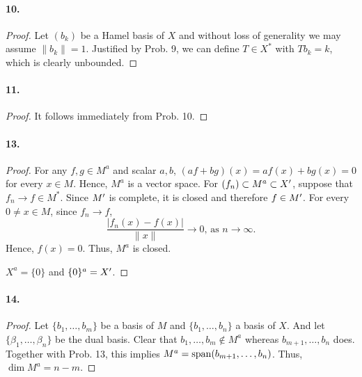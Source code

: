   \paragraph{10.}
  \begin{proof}
    Let $(b_k)$ be a Hamel basis of $X$ and without loss of generality we may
    assume $\|b_k\|=1$. Justified by Prob. 9, we can define $T\in X^*$ with 
    $Tb_k=k$, which is clearly unbounded.
  \end{proof}

  \paragraph{11.}
  \begin{proof}
    It follows immediately from Prob. 10.
  \end{proof}

  \paragraph{13.}
  \begin{proof}
    For any $f,g\in M^a$ and scalar $a,b$, $(af+bg)(x)=af(x)+bg(x)=0$ for every
    $x\in M$. Hence, $M^a$ is a vector space. For $(f_n)\subset M^a\subset 
    X^\prime$, suppose that $f_n\to f\in M^*$. Since $M^\prime$ is complete, it is
    closed and therefore $f\in M^\prime$. For every $0\ne x\in M$, since $f_n\to f$,
    \[
      \frac{|f_n(x)-f(x)|}{\|x\|} \to 0,\,\text{as $n\to\infty$}. 
    \]
    Hence, $f(x)=0$. Thus, $M^a$ is closed.\par
    $X^a = \{0\}$ and $\{0\}^a = X^\prime$.
  \end{proof}

  \paragraph{14.}
  \begin{proof}
    Let $\{b_1,\dots,b_m\}$ be a basis of $M$ and $\{b_1,\dots,b_n\}$ a basis of
    $X$. And let $\{\beta_1,\dots,\beta_n\}$ be the dual basis. Clear that $b_1,
    \dots,b_m\notin M^a$ whereas $b_{m+1},\dots,b_n$ does. Together with Prob.
    13, this implies $M^a=\operatorname{span}(b_{m+1},\dots,b_n)$. Thus, $\dim M^a = n-m$.
  \end{proof}
